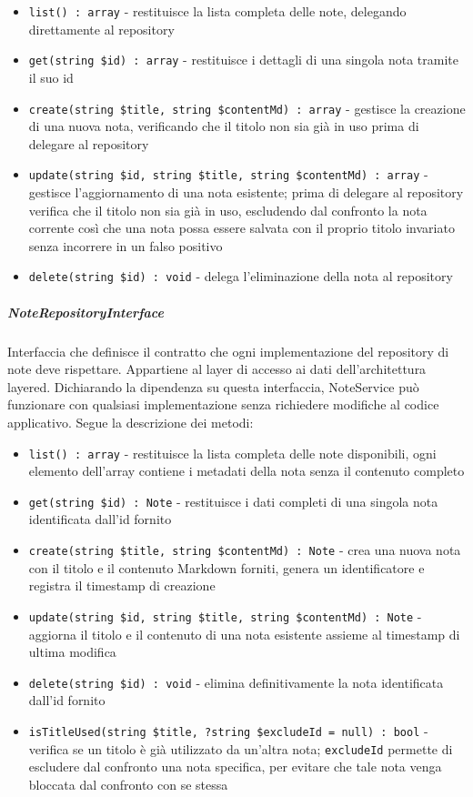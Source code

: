\documentclass[a4paper,10pt]{article}
\begin{document}
\begin{itemize}
    \item \texttt{list() : array} - restituisce la lista completa delle note, delegando direttamente al repository
    \item \texttt{get(string \$id) : array} - restituisce i dettagli di una singola nota tramite il suo id
    \item \texttt{create(string \$title, string \$contentMd) : array} - gestisce la creazione di una nuova nota, verificando che il titolo non sia già in uso prima di delegare al repository 
    \item \texttt{update(string \$id, string \$title, string \$contentMd) : array} - gestisce l'aggiornamento di una nota esistente; prima di delegare al repository verifica che il titolo non sia già in uso, escludendo dal confronto la nota corrente così che una nota possa essere salvata con il proprio titolo invariato senza incorrere in un falso positivo
    \item \texttt{delete(string \$id) : void} - delega l'eliminazione della nota al repository
\end{itemize}
\subparagraph{NoteRepositoryInterface} Interfaccia che definisce il contratto che ogni implementazione del repository di note deve rispettare. Appartiene al layer di accesso ai dati dell'architettura layered. Dichiarando la dipendenza su questa interfaccia, NoteService può funzionare con qualsiasi implementazione senza richiedere modifiche al codice applicativo. Segue la descrizione dei metodi: 
\begin{itemize}
    \item \texttt{list() : array} - restituisce la lista completa delle note disponibili, ogni elemento dell'array contiene i metadati della nota senza il contenuto completo
    \item \texttt{get(string \$id) : Note} - restituisce i dati completi di una singola nota identificata dall'id fornito
    \item \texttt{create(string \$title, string \$contentMd) : Note} - crea una nuova nota con il titolo e il contenuto Markdown forniti, genera un identificatore e registra il timestamp di creazione
    \item \texttt{update(string \$id, string \$title, string \$contentMd) : Note} - aggiorna il titolo e il contenuto di una nota esistente assieme al timestamp di ultima modifica
    \item \texttt{delete(string \$id) : void} - elimina definitivamente la nota identificata dall'id fornito
    \item \texttt{isTitleUsed(string \$title, ?string \$excludeId = null) : bool} - verifica se un titolo è già utilizzato da un'altra nota; \texttt{excludeId} permette di escludere dal confronto una nota specifica, per evitare che tale nota venga bloccata dal confronto con se stessa
\end{itemize}
\end{document}
